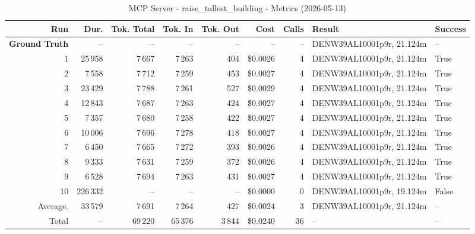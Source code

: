 \documentclass[a4paper,11pt]{article}
\begin{document}
\begin{table}[ht]
\centering
\scriptsize
\caption{MCP Server - raise\_tallest\_building - Metrics (2026-05-13)}
\label{tab:mcp\_raise\_tallest\_building\_metrics\_2026-05-13}
\begin{tabular}{r r r r r r r p{3cm} l}
\hline
Run & Dur. & Tok. Total & Tok. In & Tok. Out & Cost & Calls & Result & Success \\
\hline
\textbf{Ground Truth} & -- & -- & -- & -- & -- & -- & DENW39AL10001p9r, 21.124m & -- \\
\hline
1 & 25\,958 & 7\,667 & 7\,263 & 404 & \$0.0026 & 4 & DENW39AL10001p9r, 21.124m & True \\
2 & 7\,558 & 7\,712 & 7\,259 & 453 & \$0.0027 & 4 & DENW39AL10001p9r, 21.124m & True \\
3 & 23\,429 & 7\,788 & 7\,261 & 527 & \$0.0029 & 4 & DENW39AL10001p9r, 21.124m & True \\
4 & 12\,843 & 7\,687 & 7\,263 & 424 & \$0.0027 & 4 & DENW39AL10001p9r, 21.124m & True \\
5 & 7\,357 & 7\,680 & 7\,258 & 422 & \$0.0027 & 4 & DENW39AL10001p9r, 21.124m & True \\
6 & 10\,006 & 7\,696 & 7\,278 & 418 & \$0.0027 & 4 & DENW39AL10001p9r, 21.124m & True \\
7 & 6\,450 & 7\,665 & 7\,272 & 393 & \$0.0026 & 4 & DENW39AL10001p9r, 21.124m & True \\
8 & 9\,333 & 7\,631 & 7\,259 & 372 & \$0.0026 & 4 & DENW39AL10001p9r, 21.124m & True \\
9 & 6\,528 & 7\,694 & 7\,263 & 431 & \$0.0027 & 4 & DENW39AL10001p9r, 21.124m & True \\
10 & 226\,332 & -- & -- & -- & \$0.0000 & 0 & DENW39AL10001p9r, 19.124m & False \\
\hline
Average. & 33\,579 & 7\,691 & 7\,264 & 427 & \$0.0024 & 3 & DENW39AL10001p9r, 21.124m & -- \\
Total & -- & 69\,220 & 65\,376 & 3\,844 & \$0.0240 & 36 & -- & -- \\
\hline
\end{tabular}
\end{table}

\clearpage
\end{document}
